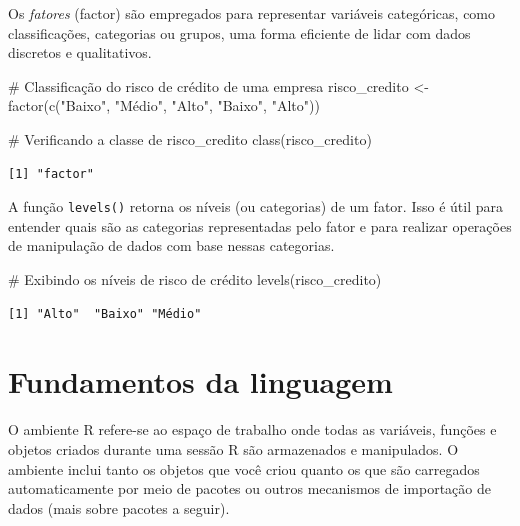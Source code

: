 \documentclass[
  letterpaper,
  DIV=11,
  numbers=noendperiod]{scrreprt}
\newenvironment{Shaded}{\begin{snugshade}}{\end{snugshade}}
\newcommand{\CommentTok}[1]{\textcolor[rgb]{0.37,0.37,0.37}{#1}}
\newcommand{\FunctionTok}[1]{\textcolor[rgb]{0.28,0.35,0.67}{#1}}
\newcommand{\NormalTok}[1]{\textcolor[rgb]{0.00,0.23,0.31}{#1}}
\newcommand{\OtherTok}[1]{\textcolor[rgb]{0.00,0.23,0.31}{#1}}
\newcommand{\StringTok}[1]{\textcolor[rgb]{0.13,0.47,0.30}{#1}}
\begin{document}
Os \emph{fatores} (factor) são empregados para representar variáveis
categóricas, como classificações, categorias ou grupos, uma forma
eficiente de lidar com dados discretos e qualitativos.

\begin{Shaded}
\begin{Highlighting}[]
\CommentTok{\# Classificação do risco de crédito de uma empresa}
\NormalTok{risco\_credito }\OtherTok{\textless{}{-}} \FunctionTok{factor}\NormalTok{(}\FunctionTok{c}\NormalTok{(}\StringTok{"Baixo"}\NormalTok{, }\StringTok{"Médio"}\NormalTok{, }\StringTok{"Alto"}\NormalTok{, }\StringTok{"Baixo"}\NormalTok{, }\StringTok{"Alto"}\NormalTok{))}

\CommentTok{\# Verificando a classe de risco\_credito}
\FunctionTok{class}\NormalTok{(risco\_credito)}
\end{Highlighting}
\end{Shaded}

\begin{verbatim}
[1] "factor"
\end{verbatim}

A função \texttt{levels()} retorna os níveis (ou categorias) de um
fator. Isso é útil para entender quais são as categorias representadas
pelo fator e para realizar operações de manipulação de dados com base
nessas categorias.

\begin{Shaded}
\begin{Highlighting}[]
\CommentTok{\# Exibindo os níveis de risco de crédito}
\FunctionTok{levels}\NormalTok{(risco\_credito)}
\end{Highlighting}
\end{Shaded}

\begin{verbatim}
[1] "Alto"  "Baixo" "Médio"
\end{verbatim}

\hypertarget{fundamentos-da-linguagem}{%
\section{Fundamentos da linguagem}\label{fundamentos-da-linguagem}}

O ambiente R refere-se ao espaço de trabalho onde todas as variáveis,
funções e objetos criados durante uma sessão R são armazenados e
manipulados. O ambiente inclui tanto os objetos que você criou quanto os
que são carregados automaticamente por meio de pacotes ou outros
mecanismos de importação de dados (mais sobre pacotes a seguir).
\end{document}
